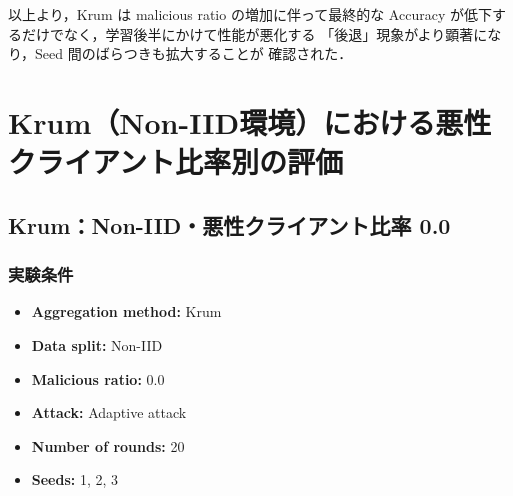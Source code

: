 \documentclass[a4j,twocolumn,dvipdfmx]{jsarticle}
\begin{document}
以上より，Krum は malicious ratio の増加に伴って最終的な
Accuracy が低下するだけでなく，学習後半にかけて性能が悪化する
「後退」現象がより顕著になり，Seed 間のばらつきも拡大することが
確認された．

\clearpage
\section{Krum（Non-IID環境）における悪性クライアント比率別の評価}

\subsection{Krum：Non-IID・悪性クライアント比率 0.0}

\subsubsection{実験条件}

\begin{itemize}
    \item \textbf{Aggregation method:} Krum
    \item \textbf{Data split:} Non-IID
    \item \textbf{Malicious ratio:} 0.0
    \item \textbf{Attack:} Adaptive attack
    \item \textbf{Number of rounds:} 20
    \item \textbf{Seeds:} 1, 2, 3
\end{itemize}

\end{document}
